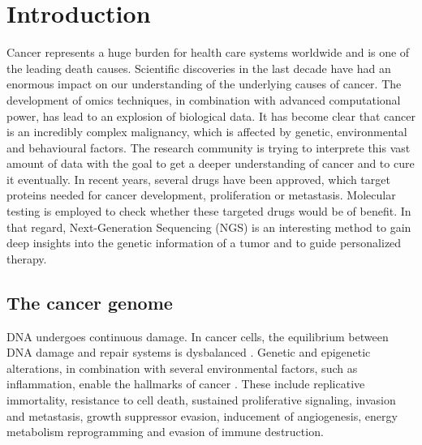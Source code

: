 \section{Introduction}

  Cancer represents a huge burden for health care systems worldwide and is one
  of the leading death causes. Scientific discoveries in the last decade have
  had an enormous impact on our understanding of the underlying causes of
  cancer. The development of omics techniques, in combination with advanced
  computational power, has lead to an explosion of biological data. It has
  become clear that cancer is an incredibly complex malignancy, which is
  affected by genetic, environmental and behavioural factors. The research
  community is trying to interprete this vast amount of data with the goal to
  get a deeper understanding of cancer and to cure it eventually. In recent
  years, several drugs have been approved, which target proteins needed for
  cancer development, proliferation or metastasis. Molecular testing is employed
  to check whether these targeted drugs would be of benefit. In that regard,
  Next-Generation Sequencing (NGS) is an interesting method to gain deep
  insights into the genetic information of a tumor and to guide personalized
  therapy.

  \subsection{The cancer genome}

    DNA undergoes continuous damage. In cancer cells, the equilibrium
    between DNA damage and repair systems is dysbalanced
    {\cite{dna_repair_epidemioloy}}. Genetic and epigenetic alterations, in
    combination with several environmental factors, such as inflammation, enable
    the hallmarks of cancer {\cite{cancer_hallmarks}}. These include replicative
    immortality, resistance to cell death, sustained proliferative signaling,
    invasion and metastasis, growth suppressor evasion, inducement of
    angiogenesis, energy metabolism reprogramming and evasion of immune
    destruction.

